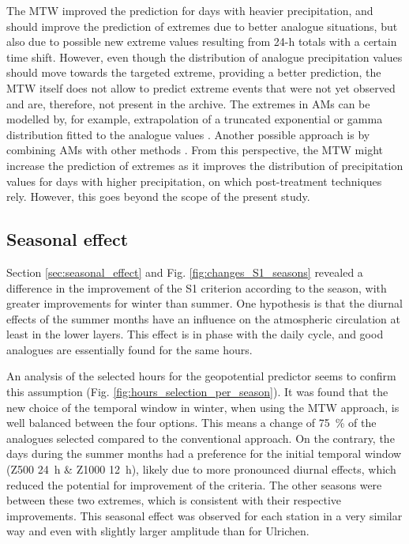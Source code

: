 \documentclass[hess, manuscript]{copernicus}
\begin{document}
	The MTW improved the prediction for days with heavier precipitation, and should improve the prediction of extremes due to better analogue situations, but also due to possible new extreme values resulting from 24-h totals with a certain time shift. However, even though the distribution of analogue precipitation values should move towards the targeted extreme, providing a better prediction, the MTW itself does not allow to predict extreme events that were not yet observed and are, therefore, not present in the archive. The extremes in AMs can be modelled by, for example, extrapolation of a truncated exponential or gamma distribution fitted to the analogue values \citep{Obled2002}. Another possible approach is by combining AMs with other methods \citep[e.g.][]{Chardon2014}. From this perspective, the MTW might increase the prediction of extremes as it improves the distribution of precipitation values for days with higher precipitation, on which post-treatment techniques rely. However, this goes beyond the scope of the present study.
	
	
	\subsection{Seasonal effect}
	
	Section \ref{sec:seasonal_effect} and Fig. \ref{fig:changes_S1_seasons} revealed a difference in the improvement of the S1 criterion according to the season, with greater improvements for winter than summer. One hypothesis is that the diurnal effects of the summer months have an influence on the atmospheric circulation at least in the lower layers. This effect is in phase with the daily cycle, and good analogues are essentially found for the same hours.
	
	An analysis of the selected hours for the geopotential predictor seems to confirm this assumption (Fig. \ref{fig:hours_selection_per_season}). It was found that the new choice of the temporal window in winter, when using the MTW approach, is well balanced between the four options. This means a change of 75~\% of the analogues selected compared to the conventional approach. On the contrary, the days during the summer months had a preference for the initial temporal window (Z500 24~h \& Z1000 12~h), likely due to more pronounced diurnal effects, which reduced the potential for improvement of the criteria. The other seasons were between these two extremes, which is consistent with their respective improvements. This seasonal effect was observed for each station in a very similar way and even with slightly larger amplitude than for Ulrichen.
	
\end{document}
